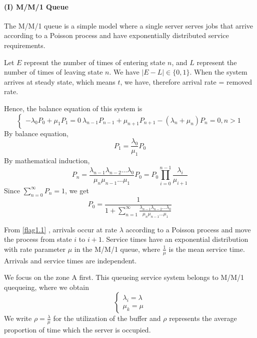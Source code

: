 \documentclass{mcmthesis}
\begin{document}
		\paragraph{(I) M/M/1 Queue}%
			The M/M/1 queue is a simple model where a single server serves jobs that arrive according to a Poisson process and have exponentially distributed service requirements. 
			
			Let ${E}$ represnt the number of times of entering state ${n}$, and ${L}$ represent the number of times of leaving state ${n}$. We have ${|E - L| \in \{0,1\}}$. When the system arrives at steady state, which means ${t}$, we have, therefore arrival rate = removed rate.
			
			Hence, the balance equation of this system is 
				\begin{equation}    
					\left  \{
       						\begin{array}{lr}
        						   - \lambda _0 P_0 + \mu _1 P_1 = 0\
        						   \lambda _{n-1} P_{n-1} + \mu _{n+1} P_{n+1} -(\lambda _n + \mu _n ) P_n = 0,n>1
  					      \end{array}
					\right.
				\end{equation}
			By balance equation, 
			$${P_1 = \frac{\lambda _0}{ \mu _1}P_0 }$$
			By mathematical induction,
				\begin{equation}
					P_n = \frac {\lambda _{n-1} \lambda _{n-2} \dots \lambda_0}{\mu _n \mu_{n-1} \dots \mu _1}P_0 = P_0\prod_{i=0}^{n-1} \frac{\lambda _i}{\mu _{i+1}}  
				\end{equation}
			Since ${\sum\limits_{n=0}^{ \infty } P_n = 1}$, we get
				\begin{equation}
					P_0 = \frac{1}{1 + \sum\limits_{n=1}^{ \infty} \frac {\lambda _{n-1} \lambda _{n-2} \dots \lambda_0}{\mu _n \mu_{n-1} \dots \mu _1}}
				\end{equation}
				
			From \ref{flag1.1} , arrivals occur at rate ${\lambda}$ according to a Poisson process and move the process from state ${i}$ to ${i + 1}$. Service times have an exponential distribution with rate parameter ${\mu}$ in the M/M/1 queue, where ${\frac{1}{\mu}}$ is the mean service time. Arrivals and service times are independent.
			
			We focus on the zone A first. This queueing service system belongs to M/M/1 quequeing, where we obtain
				\begin{equation}    
					\left  \{
       						\begin{array}{lr}
        						  \lambda_i = \lambda\\
        						  \mu_k = \mu
  					      \end{array}
					\right.
				\end{equation}
			We write ${\rho = \frac{\lambda}{\mu}}$ for the utilization of the buffer and  ${\rho}$ represents the average proportion of time which the server is occupied.
			
\end{document}
